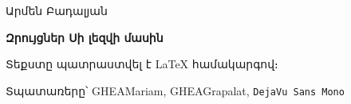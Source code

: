 \newpage\null\strut
\vskip3cm

\begin{center}
Արմեն Բադալյան

\medskip
\textbf{Զրույցներ Սի լեզվի մասին}

\thispagestyle{empty}
\vfill

\begin{small}
Տեքստը պատրաստվել է \LaTeX{} համակարգով։

Տպատառերը՝ GHEAMariam, \textsf{GHEAGrapalat},
\texttt{DejaVu Sans Mono}
\end{small}

\end{center}
